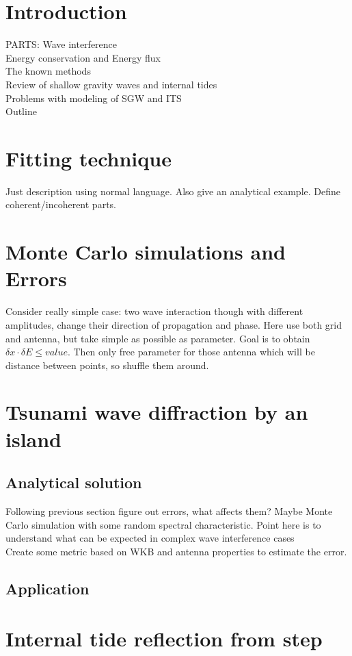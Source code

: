 \section{Introduction}
PARTS:
Wave interference\\
Energy conservation and Energy flux\\
The known methods\\
Review of shallow gravity waves and internal tides\\
Problems with modeling of SGW and ITS\\
Outline

\section{Fitting technique}
Just description using normal language. Also give an analytical example. Define coherent/incoherent parts.

\section{Monte Carlo simulations and Errors}
Consider really simple case: two wave interaction though with different amplitudes, change their direction of propagation and phase. Here use both grid and antenna, but take simple as possible as parameter. Goal is to obtain $\delta x \cdot \delta E \leq value$. Then only free parameter for those antenna which will be distance between points, so shuffle them around.

\section{Tsunami wave diffraction by an island}
\subsection{Analytical solution}
Following previous section figure out errors, what affects them? Maybe Monte Carlo simulation with some random spectral characteristic. Point here is to understand what can be expected in complex wave interference cases\\
Create some metric based on WKB and antenna properties to estimate the error.
\subsection{Application}

\section{Internal tide reflection from step}
